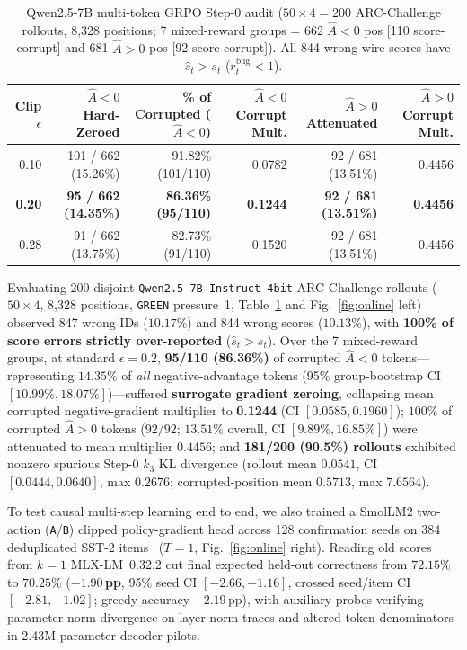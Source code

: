 \documentclass[11pt,letterpaper]{article}
\begin{document}
\begin{table}[t]
\centering
\setlength{\tabcolsep}{3.3pt}
\caption{Qwen2.5-7B multi-token GRPO Step-0 audit ($50\times 4 = 200$ ARC-Challenge rollouts, 8,328 positions; 7 mixed-reward groups = 662 $\hat{A}<0$ pos [110 score-corrupt] and 681 $\hat{A}>0$ pos [92 score-corrupt]). All 844 wrong wire scores have $\hat{s}_t > s_t$ ($r_t^{\text{bug}} < 1$).}
\label{tab:grpo7b}
\footnotesize
\begin{tabular}{@{}rrrrrr@{}}\toprule
Clip $\epsilon$ & $\hat{A}{<}0$ Hard-Zeroed & \% of Corrupted ($\hat{A}{<}0$) & $\hat{A}{<}0$ Corrupt Mult. & $\hat{A}{>}0$ Attenuated & $\hat{A}{>}0$ Corrupt Mult.\\\midrule
0.10 & 101 / 662 (15.26\%) & 91.82\% (101/110) & 0.0782 & 92 / 681 (13.51\%) & 0.4456\\
\textbf{0.20} & \textbf{95 / 662 (14.35\%)} & \textbf{86.36\% (95/110)} & \textbf{0.1244} & \textbf{92 / 681 (13.51\%)} & \textbf{0.4456}\\
0.28 & 91 / 662 (13.75\%) & 82.73\% (91/110) & 0.1520 & 92 / 681 (13.51\%) & 0.4456\\\bottomrule
\end{tabular}
\end{table}

Evaluating 200 disjoint \texttt{Qwen2.5-7B-\allowbreak Instruct-4bit} ARC-Challenge rollouts ($50\times 4$, 8,328 positions, \texttt{GREEN} pressure~1, Table~\ref{tab:grpo7b} and Fig.~\ref{fig:online} left) observed 847 wrong IDs ($10.17\%$) and 844 wrong scores ($10.13\%$), with \textbf{100\% of score errors strictly over-reported} ($\hat{s}_t > s_t$). Over the 7 mixed-reward groups, at standard $\epsilon=0.2$, \textbf{95/110 (86.36\%)} of corrupted $\hat{A}<0$ tokens---representing $14.35\%$ of \emph{all} negative-advantage tokens (95\% group-bootstrap CI $[10.99\%, 18.07\%]$)---suffered \textbf{surrogate gradient zeroing}, collapsing mean corrupted negative-gradient multiplier to \textbf{0.1244} (CI $[0.0585, 0.1960]$); $100\%$ of corrupted $\hat{A}>0$ tokens ($92/92$; $13.51\%$ overall, CI $[9.89\%, 16.85\%]$) were attenuated to mean multiplier $0.4456$; and \textbf{181/200 (90.5\%) rollouts} exhibited nonzero spurious Step-0 $k_3$ KL divergence (rollout mean $0.0541$, CI $[0.0444, 0.0640]$, max $0.2676$; corrupted-position mean $0.5713$, max $7.6564$).

To test causal multi-step learning end to end, we also trained a SmolLM2 two-action (\texttt{A}/\texttt{B}) clipped policy-gradient head across 128 confirmation seeds on 384 deduplicated SST-2 items~\cite{sst} ($T=1$, Fig.~\ref{fig:online} right). Reading old scores from $k=1$ MLX-LM~0.32.2 cut final expected held-out correctness from $72.15\%$ to $70.25\%$ (\textbf{$-1.90$\,pp}, 95\% seed CI $[-2.66, -1.16]$, crossed seed/item CI $[-2.81, -1.02]$; greedy accuracy $-2.19$\,pp), with auxiliary probes verifying parameter-norm divergence on layer-norm traces and altered token denominators in 2.43M-parameter decoder pilots.
\end{document}
